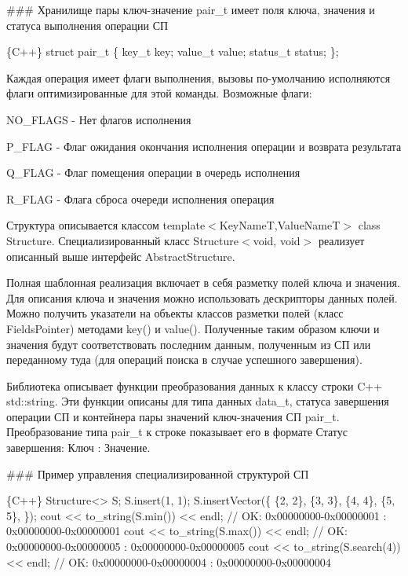 \#\#\# Хранилище пары ключ-\/значение {\ttfamily pair\+\_\+t} имеет поля ключа, значения и статуса выполнения операции СП 
\begin{DoxyCode}
\{C++\}
struct pair\_t
  \{
    key\_t    key;
    value\_t  value;
    status\_t status;
  \};
\end{DoxyCode}


Каждая операция имеет флаги выполнения, вызовы по-\/умолчанию исполняются флаги оптимизированные для этой команды. Возможные флаги\+:


\begin{DoxyItemize}
\item N\+O\+\_\+\+F\+L\+A\+GS -\/ Нет флагов исполнения
\item P\+\_\+\+F\+L\+AG -\/ Флаг ожидания окончания исполнения операции и возврата результата
\item Q\+\_\+\+F\+L\+AG -\/ Флаг помещения операции в очередь исполнения
\item R\+\_\+\+F\+L\+AG -\/ Флага сброса очереди исполнения операция 


\end{DoxyItemize}

Структура описывается классом {\ttfamily template$<$Key\+NameT,Value\+NameT$>$ class Structure}. Специализированный класс {\ttfamily Structure$<$void, void$>$} реализует описанный выше интерфейс {\ttfamily Abstract\+Structure}.

Полная шаблонная реализация включает в себя разметку полей ключа и значения. Для описания ключа и значения можно использовать дескрипторы данных полей. Можно получить указатели на объекты классов разметки полей (класс {\ttfamily Fields\+Pointer}) методами {\ttfamily key()} и {\ttfamily value()}. Полученные таким образом ключи и значения будут соответствовать последним данным, полученным из СП или переданному туда (для операций поиска в случае успешного завершения).

Библиотека описывает функции преобразования данных к классу строки C++ {\ttfamily std\+::string}. Эти функции описаны для типа данных {\ttfamily data\+\_\+t}, статуса завершения операции СП и контейнера пары значений ключ-\/значения СП {\ttfamily pair\+\_\+t}. Преобразование типа {\ttfamily pair\+\_\+t} к строке показывает его в формате {\ttfamily Статус завершения\+: Ключ \+: Значение}.

\#\#\# Пример управления специализированной структурой СП 
\begin{DoxyCode}
\{C++\}
  Structure<> S;
  S.insert(1, 1);
  S.insertVector(\{
    \{2, 2\},
    \{3, 3\},
    \{4, 4\},
    \{5, 5\},
  \});
  cout << to\_string(S.min()) << endl;     // OK: 0x00000000-0x00000001 : 0x00000000-0x00000001
  cout << to\_string(S.max()) << endl;     // OK: 0x00000000-0x00000005 : 0x00000000-0x00000005
  cout << to\_string(S.search(4)) << endl; // OK: 0x00000000-0x00000004 : 0x00000000-0x00000004
\end{DoxyCode}


